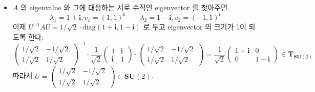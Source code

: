 \documentclass[12pt]{report}
\newcommand{\numl}[1]{\item[\large\textbf{\sffamily #1}]}
\newcommand{\rmbf}[1]{\mathrm{\mathbf{#1}}}
\newcommand{\trans}{^{\mathrm{\mathbf{t}}}}
\newcommand{\inv}{^{-1}}
\newcommand{\diag}{\text{diag}}
\renewcommand{\inv}{^{-1}}
\begin{document}
\begin{itemize}
\numl{15.2.14} $A$ 의 eigenvalue 와 그에 대응하는 서로 수직인 eigenvector 를 찾아주면 $$\lambda_1 = 1+\rmbf{i}, v_1 = (1, 1)\trans \qquad \lambda_2 = 1 -\rmbf{i}, v_2 = (-1, 1)\trans$$ 이제 $U\inv A U = 1/\sqrt{2}\cdot \diag(1 + \rmbf{i}, 1-\rmbf{i})$ 로 두고 eigenvector 의 크기가 1이 되도록 한다. 
$$\begin{pmatrix}
	1/\sqrt{2} & -1/\sqrt{2} \\ 1/\sqrt{2} & 1/\sqrt{2}
\end{pmatrix}^{-1}\cdot \frac{1}{\sqrt{2}} \begin{pmatrix}
	1 & \rmbf{i} \\ \rmbf{i} & 1
\end{pmatrix}\cdot \begin{pmatrix}
1/\sqrt{2} & -1/\sqrt{2} \\ 1/\sqrt{2} & 1/\sqrt{2}
\end{pmatrix} = \frac{1}{\sqrt{2}}\begin{pmatrix}
	1+\rmbf{i} & 0 \\ 0 & 1-\rmbf{i}
\end{pmatrix} \in \rmbf{T}_{\rmbf{SU}(2)}$$ 따라서 $U = \begin{pmatrix}
1/\sqrt{2} & -1/\sqrt{2} \\ 1/\sqrt{2} & 1/\sqrt{2}
\end{pmatrix} \in \rmbf{SU}(2)$.


\end{itemize}
\end{document}
